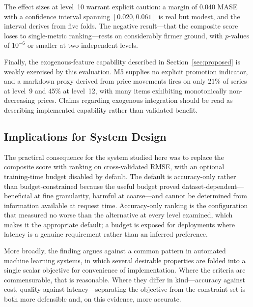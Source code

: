 The effect sizes at level~10 warrant explicit caution: a margin of 0.040 MASE with a confidence interval spanning $[0.020, 0.061]$ is real but modest, and the interval derives from five folds. The negative result---that the composite score loses to single-metric ranking---rests on considerably firmer ground, with $p$-values of $10^{-6}$ or smaller at two independent levels.

Finally, the exogenous-feature capability described in Section~\ref{sec:proposed} is weakly exercised by this evaluation. M5 supplies no explicit promotion indicator, and a markdown proxy derived from price movements fires on only 21\% of series at level~9 and 45\% at level~12, with many items exhibiting monotonically non-decreasing prices. Claims regarding exogenous integration should be read as describing implemented capability rather than validated benefit.

\subsection{Implications for System Design}
The practical consequence for the system studied here was to replace the composite score with ranking on cross-validated RMSE, with an optional training-time budget disabled by default. The default is accuracy-only rather than budget-constrained because the useful budget proved dataset-dependent---beneficial at fine granularity, harmful at coarse---and cannot be determined from information available at request time. Accuracy-only ranking is the configuration that measured no worse than the alternative at every level examined, which makes it the appropriate default; a budget is exposed for deployments where latency is a genuine requirement rather than an inferred preference.

More broadly, the finding argues against a common pattern in automated machine learning systems, in which several desirable properties are folded into a single scalar objective for convenience of implementation. Where the criteria are commensurable, that is reasonable. Where they differ in kind---accuracy against cost, quality against latency---separating the objective from the constraint set is both more defensible and, on this evidence, more accurate.
